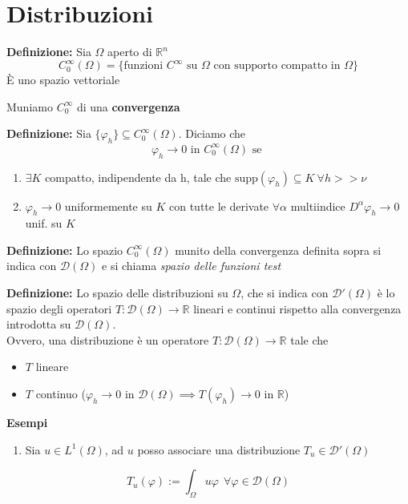 \documentclass[a4paper]{article}
\newcommand{\R}{\mathbb{R}}
\begin{document}
\section{Distribuzioni}
\begin{tcolorbox}
\textbf{Definizione: }Sia $\Omega$ aperto di $\R^n$ 
\[C_0^\infty(\Omega)=\{\text{funzioni }C^\infty\text{ su }\Omega\text{ con supporto compatto in }\Omega\}\]
È uno spazio vettoriale
\end{tcolorbox}
Muniamo $C_0^\infty$ di una \textbf{convergenza} 
\begin{tcolorbox}
	\textbf{Definizione: }Sia $\{\varphi_h\} \subseteq  C_0^\infty(\Omega)$. Diciamo che 
	\[\varphi_h\to 0\text{ in }C_0^\infty(\Omega)\text{ se }\]
\begin{enumerate}
	\item $\exists K$ compatto, indipendente da h, tale che $\text{supp}(\varphi_h)\subseteq  K\ \forall h> >\nu$
	\item $\varphi_h\to 0$ uniformemente su $K$ con tutte le derivate $\forall \alpha$ multiindice $D^\alpha\varphi_h\to 0$ unif. su $K$
\end{enumerate}
\end{tcolorbox}
\begin{tcolorbox}
	\textbf{Definizione: }Lo spazio $C_0^\infty(\Omega)$ munito della convergenza definita sopra si indica con $\mathcal D(\Omega)$ e si chiama \emph{spazio delle funzioni test}
\end{tcolorbox}
\begin{tcolorbox}
	\textbf{Definizione: }Lo spazio delle distribuzioni su $\Omega $, che si indica con $\mathcal D'(\Omega)$ è lo spazio degli operatori $T:\mathcal D(\Omega)\to \R$ lineari e continui rispetto alla convergenza introdotta su $\mathcal D(\Omega)$.\\Ovvero, una distribuzione è un operatore $T:\mathcal D(\Omega)\to \R$ tale che 
	\begin{itemize}
		\item $T$ lineare
		\item $T$ continuo ($\varphi_h\to 0$ in $\mathcal D(\Omega)\implies T(\varphi_h)\to 0$ in $\R$)
	\end{itemize}
\end{tcolorbox}
\textbf{Esempi} 
\begin{enumerate}
	\item Sia $u\in L^{1}(\Omega)$, ad $u$ posso associare una distribuzione $T_u\in \mathcal D'(\Omega)$
\end{enumerate}
\[T_u(\varphi):=\int_{\Omega}^{} u\varphi\ \ \forall \varphi\in \mathcal D(\Omega)\]
\end{document}
